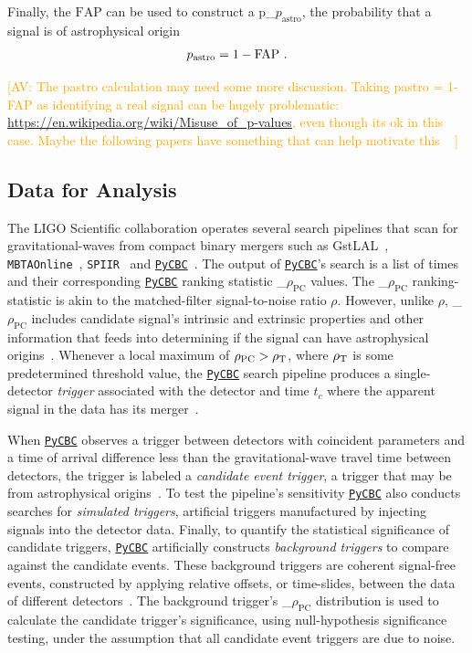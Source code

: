 \documentclass[%
 nofootinbib,
 amsmath,amssymb,
 aps,
 twocolumn,
 superscriptaddress
]{revtex4-2}
\newcommand{\gstlal}{{\sc GstLAL}\xspace}
\newcommand{\pycbc}{{\sc \href{https://pycbc.org/}{\texttt{PyCBC}}}\xspace}
\newcommand{\fancytext}[1]{{\relax\ifmmode#1\else $#1$\fi}\xspace}
\newcommand{\mathcmd}[1]{{\sc \relax\ifmmode#1\else $#1$\fi}\xspace}
\newcommand{\pycbcstat}{\mathcmd{\rho_\text{PC}}}
\newcommand{\snr}{\mathcmd{\rho}}
\newcommand{\fap}{\mathcmd{\text{FAP}}}
\newcommand{\pastro}{\fancytext{p_\text{astro}}}
\newcommand{\avi}[1]{\textcolor{orange}{[AV: #1]}}
\begin{document}
Finally, the \fap can be used to construct a \pastro, the probability that a signal is of astrophysical origin~\cite{pastro_1,pastro_2,pastro_3}
\begin{equation}
    \pastro = 1 -  \fap \ .
\end{equation}

\avi{
The pastro calculation may need some more discussion. Taking pastro = 1-FAP as identifying a real signal can be hugely problematic: \url{https://en.wikipedia.org/wiki/Misuse_of_p-values}, even though its ok in this case. Maybe the following papers have something that can help motivate this ~\cite{Farr:2015:PhRvD, Gaebel:2019:MNRAS,Galaudage:2020:PhRvD}
}


\subsection{Data for Analysis}
The LIGO Scientific collaboration operates several search pipelines that scan for gravitational-waves from compact binary mergers such as \gstlal~\cite{sachdev2019gstlal}, \texttt{MBTAOnline}~\cite{MBTA}, \texttt{SPIIR}~\cite{spiir} and \pycbc~\cite{pycbc_og4}. The output of \pycbc's search is a list of times and their corresponding \pycbc ranking statistic \pycbcstat values. The \pycbcstat ranking-statistic is akin to the matched-filter signal-to-noise ratio \snr. However, unlike \snr, \pycbcstat includes candidate signal's intrinsic and extrinsic properties and other information that feeds into determining if the signal can have astrophysical origins~\cite{pycbc_og6}. Whenever a local maximum of $\pycbcstat > \snr_\text{T}$, where $\snr_\text{T}$ is some predetermined threshold value, the \pycbc search pipeline produces a single-detector \textit{trigger} associated with the detector and time $t_c$ where the apparent signal in the data has its merger~\cite{pycbc_og6}.

When \pycbc observes a trigger between detectors with coincident parameters and a time of arrival difference less than the gravitational-wave travel time between detectors, the trigger is labeled a \textit{candidate event trigger}, a trigger that may be from astrophysical origins~\cite{pycbc_og1}. To test the pipeline's sensitivity \pycbc also conducts searches for \textit{simulated triggers}, artificial triggers manufactured by injecting signals into the detector data. Finally, to quantify the statistical significance of candidate triggers, \pycbc artificially constructs \textit{background triggers} to compare against the candidate events. These background triggers are coherent signal-free events, constructed by applying relative offsets, or time-slides, between the data of different detectors~\cite{pycbc_og6}. The background trigger's \pycbcstat distribution is used to calculate the candidate trigger's significance,  using null-hypothesis significance testing, under the assumption that all candidate event triggers are due to noise.
\end{document}

